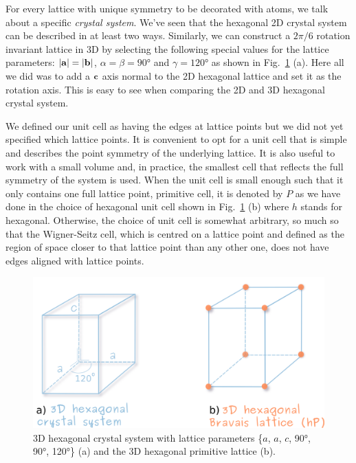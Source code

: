 \vspace{0.5cm}

For every lattice with unique symmetry to be decorated with atoms, we talk about a specific \textit{crystal system}. We've seen that the hexagonal 2D crystal system can be described in at least two ways. Similarly, we can construct a $2\pi/6$ rotation invariant lattice in 3D by selecting the following special values for the lattice parameters:  $|\vb{a}|=|\vb{b}|$, $\alpha = \beta = 90\si{\degree}$ and $\gamma=120\si{\degree}$ as shown in Fig.~\ref{Fig:hex3lattice} (a). Here all we did was to add a $\vb{c}$ axis normal to the 2D hexagonal lattice and set it as the rotation axis. This is easy to see when comparing the 2D and 3D hexagonal crystal system.
 
We defined our unit cell as having the edges at lattice points but we did not yet specified which lattice points. It is convenient to opt for a unit cell that is simple and describes the point symmetry of the underlying lattice. It is also useful to work with a small volume and, in practice, the smallest cell that reflects the full symmetry of the system is used. When the unit cell is small enough such that it only contains one full lattice point, \ie primitive cell, it is denoted by $P$ as we have done in the choice of hexagonal unit cell shown in Fig.~\ref{Fig:hex3lattice} (b) where $h$ stands for hexagonal. Otherwise, the choice of unit cell is somewhat arbitrary, so much so that the Wigner-Seitz cell, which is centred on a lattice point and defined as the region of space closer to that lattice point than any other one, does not have edges aligned with lattice points. 


 
\begin{figure}[htb]
\centering
\includegraphics[width=0.7\linewidth]{Figures/hex3Dlattice.png}
\caption[3D hexagonal crystal system.]{3D hexagonal crystal system  with lattice parameters \{$a$, $a$, $c$, 90\si{\degree}, 90\si{\degree}, 120\si{\degree}\} (a) and the 3D hexagonal primitive lattice (b).  }
\label{Fig:hex3lattice}
\end{figure}


